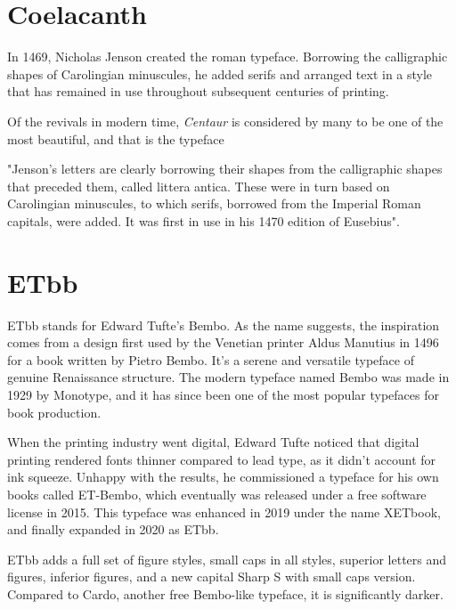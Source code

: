 %
%

\chapter[coelacanth]{Coelacanth}

In 1469, Nicholas Jenson created the roman typeface. Borrowing the calligraphic shapes of Carolingian minuscules, he added serifs and arranged text in a style that has remained in use throughout subsequent centuries of printing.

Of the revivals in modern time, {\it Centaur} is considered by many to be one of the most beautiful, and that is the typeface 

"Jenson's letters are clearly borrowing their shapes from the calligraphic shapes that preceded them, called littera antica. These were in turn based on Carolingian minuscules, to which serifs, borrowed from the Imperial Roman capitals, were added. It was first in use in his 1470 edition of Eusebius".
 

%
%

\switchtobodyfont[etbb,10pt]
\chapter[etbb]{ETbb}

ETbb stands for Edward Tufte’s Bembo. As the name suggests, the inspiration comes from a design first used by the Venetian printer Aldus Manutius in 1496 for a book written by Pietro Bembo. It’s a serene and versatile typeface of genuine Renaissance structure. The modern typeface named Bembo was made in 1929 by Monotype, and it has since been one of the most popular typefaces for book production.

When the printing industry went digital, Edward Tufte noticed that digital printing rendered fonts thinner compared to lead type, as it didn’t account for ink squeeze. Unhappy with the results, he commissioned a typeface for his own books called ET-Bembo, which eventually was released under a free software license in 2015. This typeface was enhanced in 2019 under the name XETbook, and finally expanded in 2020 as ETbb.

ETbb adds a full set of figure styles, small caps in all styles, superior letters and figures, inferior figures, and a new capital Sharp S with small caps version. Compared to Cardo, another free Bembo-like typeface, it is significantly darker.

